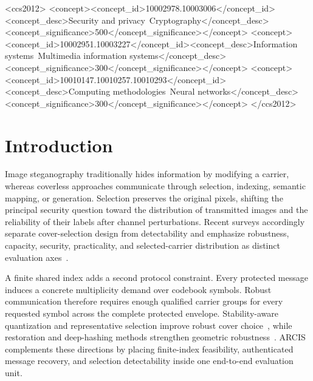 \documentclass[acmsmall,review,screen]{acmart}
\newcommand{\method}{ARCIS\xspace}
\begin{document}
\begin{CCSXML}
<ccs2012>
 <concept><concept_id>10002978.10003006</concept_id><concept_desc>Security and privacy~Cryptography</concept_desc><concept_significance>500</concept_significance></concept>
 <concept><concept_id>10002951.10003227</concept_id><concept_desc>Information systems~Multimedia information systems</concept_desc><concept_significance>300</concept_significance></concept>
 <concept><concept_id>10010147.10010257.10010293</concept_id><concept_desc>Computing methodologies~Neural networks</concept_desc><concept_significance>300</concept_significance></concept>
</ccs2012>
\end{CCSXML}


\maketitle

\section{Introduction}
Image steganography traditionally hides information by modifying a carrier, whereas coverless approaches communicate through selection, indexing, semantic mapping, or generation. Selection preserves the original pixels, shifting the principal security question toward the distribution of transmitted images and the reliability of their labels after channel perturbations. Recent surveys accordingly separate cover-selection design from detectability and emphasize robustness, capacity, security, practicality, and selected-carrier distribution as distinct evaluation axes~\cite{azam2025review,xiang2025survey,kombrink2025survey}.

A finite shared index adds a second protocol constraint. Every protected message induces a concrete multiplicity demand over codebook symbols. Robust communication therefore requires enough qualified carrier groups for every requested symbol across the complete protected envelope. Stability-aware quantization and representative selection improve robust cover choice~\cite{guo2026capacity}, while restoration and deep-hashing methods strengthen geometric robustness~\cite{meng2025restoration,tan2026hashing}. \method complements these directions by placing finite-index feasibility, authenticated message recovery, and selection detectability inside one end-to-end evaluation unit.
\end{document}
